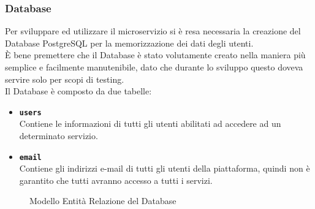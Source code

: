 \subsubsection{Database}
Per sviluppare ed utilizzare il microservizio si è resa necessaria la creazione del Database PostgreSQL per la memorizzazione dei dati degli utenti.\\
È bene premettere che il Database è stato volutamente creato nella maniera più semplice e facilmente manutenibile, dato che durante lo sviluppo questo doveva servire solo per scopi di testing.\\
Il Database è composto da due tabelle:
\begin{itemize}
		\item \textbf{\texttt{users}}\\ Contiene le informazioni di tutti gli utenti abilitati ad accedere ad un determinato servizio.
		\item \textbf{\texttt{email}}\\ Contiene gli indirizzi e-mail di tutti gli utenti della piattaforma, quindi non è garantito che tutti avranno accesso a tutti i servizi.
\end{itemize}
\begin{figure}[ht]
	\centering
	\caption{Modello Entità Relazione del Database}
	\label{fig:one}
\end{figure}

